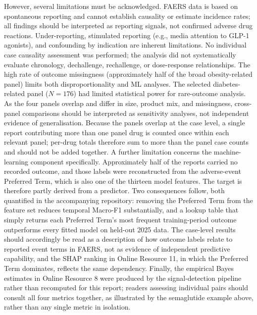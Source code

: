 \documentclass[10pt,a4paper]{article}
\begin{document}
However, several limitations must be acknowledged. FAERS data is based on spontaneous reporting and cannot establish causality or estimate incidence rates; all findings should be interpreted as reporting signals, not confirmed adverse drug reactions. Under-reporting, stimulated reporting (e.g., media attention to GLP-1 agonists), and confounding by indication are inherent limitations. No individual case causality assessment was performed; the analysis did not systematically evaluate chronology, dechallenge, rechallenge, or dose-response relationships. The high rate of outcome missingness (approximately half of the broad obesity-related panel) limits both disproportionality and ML analyses. The selected diabetes-related panel ($N=176$) had limited statistical power for rare-outcome analysis. As the four panels overlap and differ in size, product mix, and missingness, cross-panel comparisons should be interpreted as sensitivity analyses, not independent evidence of generalisation. Because the panels overlap at the case level, a single report contributing more than one panel drug is counted once within each relevant panel; per-drug totals therefore sum to more than the panel case counts and should not be added together. A further limitation concerns the machine-learning component specifically. Approximately half of the reports carried no recorded outcome, and those labels were reconstructed from the adverse-event Preferred Term, which is also one of the thirteen model features. The target is therefore partly derived from a predictor. Two consequences follow, both quantified in the accompanying repository: removing the Preferred Term from the feature set reduces temporal Macro-F1 substantially, and a lookup table that simply returns each Preferred Term's most frequent training-period outcome outperforms every fitted model on held-out 2025 data. The case-level results should accordingly be read as a description of how outcome labels relate to reported event terms in FAERS, not as evidence of independent predictive capability, and the SHAP ranking in Online Resource 11, in which the Preferred Term dominates, reflects the same dependency. Finally, the empirical Bayes estimates in Online Resource 8 were produced by the signal-detection pipeline rather than recomputed for this report; readers assessing individual pairs should consult all four metrics together, as illustrated by the semaglutide example above, rather than any single metric in isolation.
\end{document}
